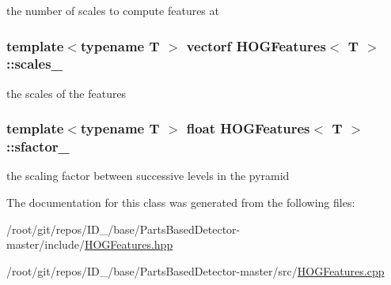 the number of scales to compute features at 

\hypertarget{classHOGFeatures_a27490a8c33c7ffbfdeedafc5af0ad544}{
\subsubsection[{scales\-\_\-}]{\setlength{\rightskip}{0pt plus 5cm}template$<$typename T $>$ {\bf vectorf} {\bf \-H\-O\-G\-Features}$<$ \-T $>$\-::{\bf scales\-\_\-}}}\label{classHOGFeatures_a27490a8c33c7ffbfdeedafc5af0ad544}


the scales of the features 

\hypertarget{classHOGFeatures_a45b232ca94e93b4f30d342374e62578f}{
\subsubsection[{sfactor\-\_\-}]{\setlength{\rightskip}{0pt plus 5cm}template$<$typename T $>$ float {\bf \-H\-O\-G\-Features}$<$ \-T $>$\-::{\bf sfactor\-\_\-}}}\label{classHOGFeatures_a45b232ca94e93b4f30d342374e62578f}


the scaling factor between successive levels in the pyramid 



\-The documentation for this class was generated from the following files\-:\begin{DoxyCompactItemize}
\item 
/root/git/repos/\-I\-D\-\_/base/\-Parts\-Based\-Detector-\/master/include/\hyperlink{HOGFeatures_8hpp}{\-H\-O\-G\-Features.\-hpp}\item 
/root/git/repos/\-I\-D\-\_/base/\-Parts\-Based\-Detector-\/master/src/\hyperlink{HOGFeatures_8cpp}{\-H\-O\-G\-Features.\-cpp}\end{DoxyCompactItemize}

